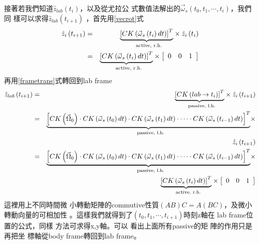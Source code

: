 \documentclass[12pt,a4paper]{article}
\begin{document}
接著若我們知道$\hat{z}_{lab}\left(
t_{i}\right) $，以及從尤拉公%
式數值法解出的$\vec{\omega}%
_{s}\left( t_{0},t_{1},\cdots ,t_{i}\right) $，我們同%
樣可以求得$\hat{z}_{lab}\left( t_{i+1}\right) $%
，首先用\ref{vecrot}式%
\begin{eqnarray}
\hat{z}_{i}\left( t_{i+1}\right) &=&\underset{\text{active, r.h.}}{%
\underbrace{\left[ CK\left( \vec{\omega}_{s}\left( t_{i}\right) dt\right) %
\right] ^{T}}}\times \hat{z}_{i}\left( t_{i}\right)  \label{iterateeq} \\
&=&\underset{\text{active, r.h.}}{\underbrace{\left[ CK\left( \vec{\omega}%
_{s}\left( t_{i}\right) dt\right) \right] ^{T}}}\times \left[ 
\begin{array}{ccc}
0 & 0 & 1%
\end{array}%
\right]  \notag
\end{eqnarray}%
再用\ref{frametrans}式轉回到lab frame%
\begin{eqnarray*}
\hat{z}_{lab}\left( t_{i+1}\right) &=&\underset{\text{passive, l.h.}}{%
\underbrace{\left[ CK\left( lab\rightarrow t_{i}\right) \right] ^{T}}}\times 
\hat{z}_{i}\left( t_{i+1}\right) \\
&=&\underset{\text{passive, l.h.}}{\underbrace{\left[ CK\left( \vec{\Omega}%
_{0}\right) \cdot CK\left( \vec{\omega}_{s}\left( t_{0}\right) dt\right)
\cdot CK\left( \vec{\omega}_{s}\left( t_{1}\right) dt\right) \cdot \cdots
\cdot CK\left( \vec{\omega}_{s}\left( t_{i-1}\right) dt\right) \right] ^{T}}}%
\times \\
&&\hat{z}_{i}\left( t_{i+1}\right) \\
&=&\underset{\text{passive, l.h.}}{\underbrace{\left[ CK\left( \vec{\Omega}%
_{0}\right) \cdot CK\left( \vec{\omega}_{s}\left( t_{0}\right) dt\right)
\cdot CK\left( \vec{\omega}_{s}\left( t_{1}\right) dt\right) \cdot \cdots
\cdot CK\left( \vec{\omega}_{s}\left( t_{i-1}\right) dt\right) \right] ^{T}}}%
\times \\
&&\underset{\text{active, r.h.}}{\underbrace{\left[ CK\left( \vec{\omega}%
_{s}\left( t_{i}\right) dt\right) \right] ^{T}}}\times \left[ 
\begin{array}{ccc}
0 & 0 & 1%
\end{array}%
\right]
\end{eqnarray*}%
這裡用上不同時間微%
小轉動矩陣的commutive性質$%
\left( AB\right) C=A\left( BC\right) $，及微小%
轉動向量的可相加性%
。這樣我們就得到了$%
\left( t_{0},t_{1},\cdots ,t_{i+1}\right) $時刻z軸在%
lab frame位置的公式，同樣%
方法可求得x,y軸。可以%
看出上面所有passive的矩%
陣的作用只是再把坐%
標軸從body frame轉回到lab frame。
\end{document}
